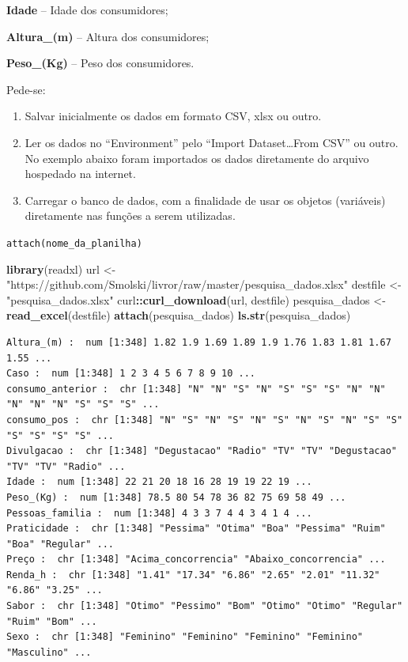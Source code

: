 \documentclass[12pt,brazil,oneside]{book}
\newenvironment{Shaded}{\begin{snugshade}}{\end{snugshade}}
\newcommand{\KeywordTok}[1]{\textcolor[rgb]{0.13,0.29,0.53}{\textbf{#1}}}
\newcommand{\NormalTok}[1]{#1}
\newcommand{\OperatorTok}[1]{\textcolor[rgb]{0.81,0.36,0.00}{\textbf{#1}}}
\newcommand{\StringTok}[1]{\textcolor[rgb]{0.31,0.60,0.02}{#1}}
\begin{document}
\textbf{Idade} -- Idade dos consumidores;

\textbf{Altura\_(m)} -- Altura dos consumidores;

\textbf{Peso\_(Kg)} -- Peso dos consumidores.

Pede-se:

\begin{enumerate}
\def\labelenumi{\arabic{enumi}.}
\item
  Salvar inicialmente os dados em formato CSV, xlsx ou outro.
\item
  Ler os dados no ``Environment'' pelo ``Import Dataset\ldots{}From CSV'' ou outro. No exemplo abaixo foram importados os dados diretamente do arquivo hospedado na internet.
\item
  Carregar o banco de dados, com a finalidade de usar os objetos (variáveis) diretamente nas funções a serem utilizadas.
\end{enumerate}

\texttt{attach(nome\_da\_planilha)}

\begin{Shaded}
\begin{Highlighting}[]
\KeywordTok{library}\NormalTok{(readxl)}
\NormalTok{url <-}\StringTok{ "https://github.com/Smolski/livror/raw/master/pesquisa_dados.xlsx"}
\NormalTok{destfile <-}\StringTok{ "pesquisa_dados.xlsx"}
\NormalTok{curl}\OperatorTok{::}\KeywordTok{curl_download}\NormalTok{(url, destfile)}
\NormalTok{pesquisa_dados <-}\StringTok{ }\KeywordTok{read_excel}\NormalTok{(destfile)}
\KeywordTok{attach}\NormalTok{(pesquisa_dados)}
\KeywordTok{ls.str}\NormalTok{(pesquisa_dados)}
\end{Highlighting}
\end{Shaded}

\begin{verbatim}
Altura_(m) :  num [1:348] 1.82 1.9 1.69 1.89 1.9 1.76 1.83 1.81 1.67 1.55 ...
Caso :  num [1:348] 1 2 3 4 5 6 7 8 9 10 ...
consumo_anterior :  chr [1:348] "N" "N" "S" "N" "S" "S" "S" "N" "N" "N" "N" "N" "S" "S" "S" ...
consumo_pos :  chr [1:348] "N" "S" "N" "S" "N" "S" "N" "S" "N" "S" "S" "S" "S" "S" "S" ...
Divulgacao :  chr [1:348] "Degustacao" "Radio" "TV" "TV" "Degustacao" "TV" "TV" "Radio" ...
Idade :  num [1:348] 22 21 20 18 16 28 19 19 22 19 ...
Peso_(Kg) :  num [1:348] 78.5 80 54 78 36 82 75 69 58 49 ...
Pessoas_familia :  num [1:348] 4 3 3 7 4 4 3 4 1 4 ...
Praticidade :  chr [1:348] "Pessima" "Otima" "Boa" "Pessima" "Ruim" "Boa" "Regular" ...
Preço :  chr [1:348] "Acima_concorrencia" "Abaixo_concorrencia" ...
Renda_h :  chr [1:348] "1.41" "17.34" "6.86" "2.65" "2.01" "11.32" "6.86" "3.25" ...
Sabor :  chr [1:348] "Otimo" "Pessimo" "Bom" "Otimo" "Otimo" "Regular" "Ruim" "Bom" ...
Sexo :  chr [1:348] "Feminino" "Feminino" "Feminino" "Feminino" "Masculino" ...
\end{verbatim}
\end{document}
